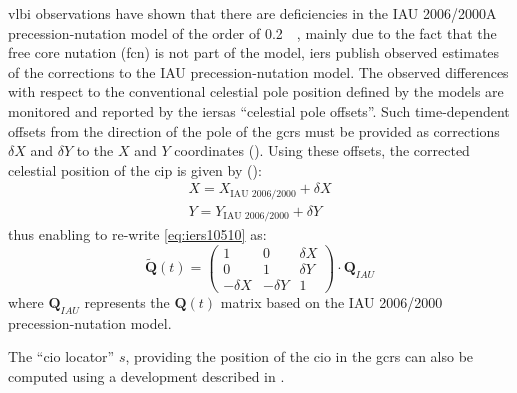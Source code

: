 \gls{vlbi} observations have shown that there are deficiencies in the 
IAU 2006/2000A precession-nutation model of the order of \SI{0.2}{\milli\larcsecond}, 
mainly due to the fact that the free core nutation (\gls{fcn}) is not part of 
the model, \gls{iers} publish observed estimates of the corrections to the 
IAU precession-nutation model. The observed differences with respect to the 
conventional celestial pole position defined by the models are monitored and 
reported by the \gls{iers}as ``celestial pole offsets''. Such time-dependent 
offsets from the direction of the pole of the \gls{gcrs} must be provided as 
corrections $\delta X$ and $\delta Y$ to the $X$ and $Y$ coordinates (\cite{iers2010}).
Using these offsets, the corrected celestial position of the \gls{cip} is 
given by (\cite{iers2010}):
\begin{equation}
  \begin{aligned}
    X = X_{\text{IAU 2006/2000}} + \delta X \\
    Y = Y_{\text{IAU 2006/2000}} + \delta Y
  \end{aligned}
\end{equation}
thus enabling to re-write \autoref{eq:iers10510} as:
\begin{equation}
  \bm{\tilde{Q}}(t) = \begin{pmatrix}
    1 & 0 & \delta X \\
    0 & 1 & \delta Y \\
    -\delta X & -\delta Y & 1
    \end{pmatrix}
    \cdot \bm{Q}_{IAU}
    \label{eq:iers10527}
\end{equation}
where $\bm{Q}_{IAU}$ represents the $\bm{Q}(t)$ matrix based on the IAU 2006/2000 
precession-nutation model.

The ``\gls{cio} locator'' $s$, providing the position of the \gls{cio} in the 
\gls{gcrs} can also be computed using a development described in \cite{Capitaine2003}.
